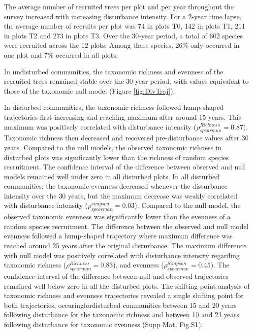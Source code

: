 \documentclass[fleqn,10pt]{ArtEcoFoG} %
\begin{document}
The average number of recruited trees per plot and per year throughout the survey increased with increasing disturbance intensity. For a 2-year time lapse, the average number of recruits per plot was 74 in plots T0, 142 in plots T1, 211 in plots T2 and 273 in plots T3. Over the 30-year period, a total of 602 species were recruited across the 12 plots. Among these species, 26\% only occurred in one plot and 7\% occurred in all plots.

In undisturbed communities, the taxonomic richness and evenness of the recruited trees remained stable over the 30-year period, with values equivalent to those of the taxonomic null model (Figure \ref{fig:DivTraj}).

In disturbed communities, the taxonomic richness followed hump-shaped trajectories first increasing and reaching maximum after around 15 years. This maximum was positively correlated with disturbance intensity (\(\rho^{Richness}_{spearman}=0.87\)).
Taxonomic richness then decreased and recovered pre-disturbance values after 30 years.
Compared to the null models, the observed taxonomic richness in disturbed plots was significantly lower than the richness of random species recruitment. The confidence interval of the difference between observed and null models remained well under zero in all disturbed plots.
In all disturbed communities, the taxonomic evenness decreased whenever the disturbance intensity over the 30 years, but the maximum decrease was weakly correlated with disturbance intensity (\(\rho^{simpson}_{spearman}=0.03\)).
Compared to the null model, the observed taxonomic evenness was significantly lower than the evenness of a random species recruitment. The difference between the observed and null model evenness followed a hump-shaped trajectory where maximum difference was reached around 25 years after the original disturbance. The maximum difference with null model was positively correlated with disturbance intensity regarding taxonomic richness (\(\rho^{Richness}_{spearman}=0.83\)), and evenness (\(\rho^{Simpson}_{spearman}=0.45\)).
The confidence interval of the difference between null and observed trajectories remained well below zero in all the disturbed plots.
The shifting point analysis of taxonomic richness and evenness trajectories revealed a single shifting point for both trajectories, occuringfordisturbed communities between 15 and 20 years following disturbance for the taxonomic richness and between 10 and 23 years following disturbance for taxonomic evenness (Supp Mat, Fig.S1).
\end{document}
